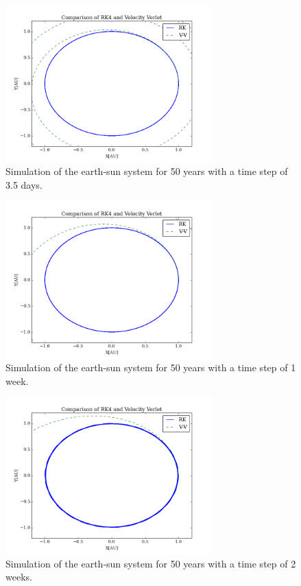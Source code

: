 \documentclass{aa}   %
\begin{document}
\begin{figure}[hbtp]
 \centering
 \includegraphics[width=80mm]{ES_3_5d_50y.png}
 \caption[]{\label{ES_3_5d_50y}
   Simulation of the earth-sun system for 50 years with a time step of 3.5 days. 
 }
\end{figure}
\begin{figure}[hbtp]
 \centering
 \includegraphics[width=80mm]{ES_7d_50y.png}
 \caption[]{\label{ES_7d_50y}
   Simulation of the earth-sun system for 50 years with a time step of 1 week. 
 }
\end{figure}
\begin{figure}[hbtp]
 \centering
 \includegraphics[width=80mm]{ES_14d_50y.png}
 \caption[]{\label{ES_14d_50y}
   Simulation of the earth-sun system for 50 years with a time step of 2 weeks.  
 }
\end{figure}
\end{document}

